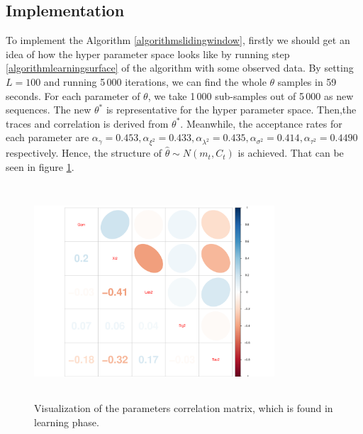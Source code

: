 \subsection{Implementation}

To implement the Algorithm \ref{algorithmslidingwindow}, firstly we should get an idea of how the hyper parameter space looks like by running step \ref{algorithmlearningsurface} of the algorithm with some observed data. By setting $L=100$ and running 5\,000 iterations, we can find the whole $\theta$ samples in 59 seconds. For each parameter of $\theta$, we take 1\,000 sub-samples out of 5\,000 as new sequences. The new $\theta^*$ is representative for the hyper parameter space. Then,the traces and correlation is derived from $\theta^*$. Meanwhile, the acceptance rates for each parameter are $\alpha_\gamma = 0.453,\alpha_{\xi^2}=0.433, \alpha_{\lambda^2}=0.435, \alpha_{\sigma^2}=0.414, \alpha_{\tau^2}=0.4490$ respectively. Hence, the structure of  $\hat{\theta}\sim N\left( m_t,C_t\right)$ is achieved. That can be seen in figure \ref{realdatacorMatrix}. 
\begin{figure}[h]
\centering
\includegraphics[width=0.8\textwidth,height=8cm]{Chapters/05MCMCOU/plots/realdatalearningcorMatrix.pdf}
\caption{Visualization of the parameters correlation matrix, which is found in learning phase. }\label{realdatacorMatrix}
\end{figure}


